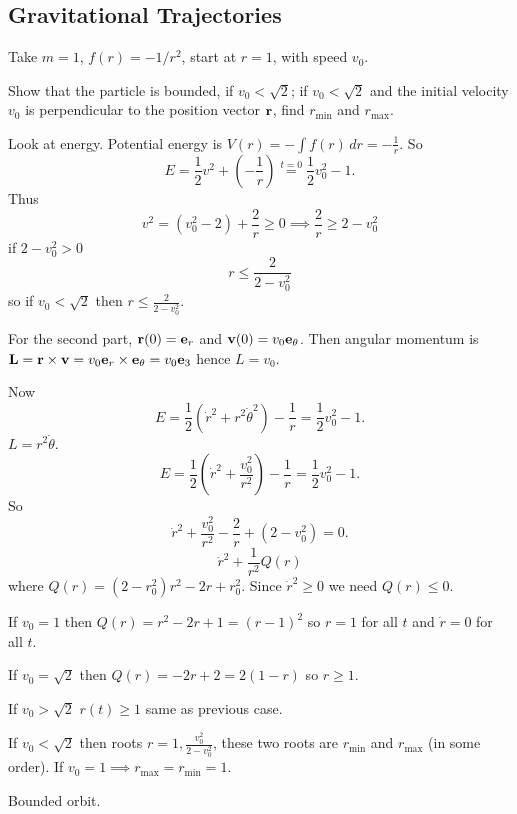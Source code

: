 \documentclass[10pt, a4paper]{article}
\begin{document}
\subsection{Gravitational Trajectories}

Take $m = 1$,
$f(r) = -1 / r ^ 2$,
start at $r = 1$,
with speed $v_0$.

\begin{problem}
    Show that the particle is bounded,
    if $v_0 < \sqrt{2}$;
    if $v_0 < \sqrt{2}$ and the initial velocity $v_0$ is perpendicular to the position vector $\mathbf{r}$,
    find $r_{\text{min}}$ and $r_{\text{max}}$.

    \begin{solution}
        Look at energy.
        Potential energy is $V(r) = -\int f(r)\,dr = -\frac{1}{r}$.
        So
        \[
        E = \frac{1}{2}v ^ 2 + \left(-\frac{1}{r}\right) \overset{t = 0}{=} \frac{1}{2}v_0 ^ 2 - 1.
        \]
        Thus
        \[
        v ^ 2 = (v_0 ^ 2 - 2) + \frac{2}{r} \geq 0 \implies \frac{2}{r} \geq 2 - v_0 ^ 2
        \]
        if $2 - v_0 ^ 2 > 0$
        \[
        r \leq \frac{2}{2 - v_0 ^ 2}
        \]
        so if $v_0 < \sqrt{2}$ then $r \leq \frac{2}{2 - v_0 ^ 2}$.


        For the second part,
        $\mathbf{r}(0) = \mathbf{e}_r$ and $\mathbf{v}(0) = v_0\mathbf{e}_{\theta}$.
        Then angular momentum is $\mathbf{L} = \mathbf{r} \times \mathbf{v} = v_0\mathbf{e}_r \times \mathbf{e}_{\theta} = v_0\mathbf{e}_3$ hence $L = v_0$.

        Now
        \[
        E = \frac{1}{2}(\dot{r} ^ 2 + r ^ 2\dot{\theta} ^ 2) - \frac{1}{r} = \frac{1}{2}v_0 ^ 2 - 1.
        \]
        $L = r ^ 2\dot{\theta}$.
        \[
        E = \frac{1}{2}\left(\dot{r} ^ 2 + \frac{v_0 ^ 2}{r ^ 2}\right) - \frac{1}{r} = \frac{1}{2}v_0 ^ 2 - 1.
        \]
        So
        \[
        \dot{r} ^ 2 + \frac{v_0 ^ 2}{r ^ 2} - \frac{2}{r} + (2 - v_0 ^ 2) = 0.
        \]
        \[
        \dot{r} ^ 2 + \frac{1}{r ^ 2}Q(r)
        \]
        where
        $Q(r) = (2 - r_0 ^ 2)r ^ 2 - 2r + r_0 ^ 2$.
        Since $\dot{r} ^ 2 \geq 0$ we need $Q(r) \leq 0$.

        If $v_0 = 1$ then $Q(r) = r ^ 2 - 2r + 1 = (r - 1) ^ 2$ so $r = 1$ for all $t$ and $\dot{r} = 0$ for all $t$.

        If $v_0 = \sqrt{2}$ then $Q(r) = -2r + 2 = 2(1 - r)$ so $r \geq 1$.

        If $v_0 > \sqrt{2}$ $r(t) \geq 1$ same as previous case.

        If $v_0 < \sqrt{2}$ then roots $r = 1, \frac{v_0 ^ 2}{2 - v_0 ^ 2}$,
        these two roots are $r_{\text{min}}$ and $r_{\text{max}}$
        (in some order).
        If $v_0 = 1 \implies r_{\text{max}} = r_{\text{min}} = 1$.

        Bounded orbit.
    \end{solution}
\end{problem}
\end{document}
